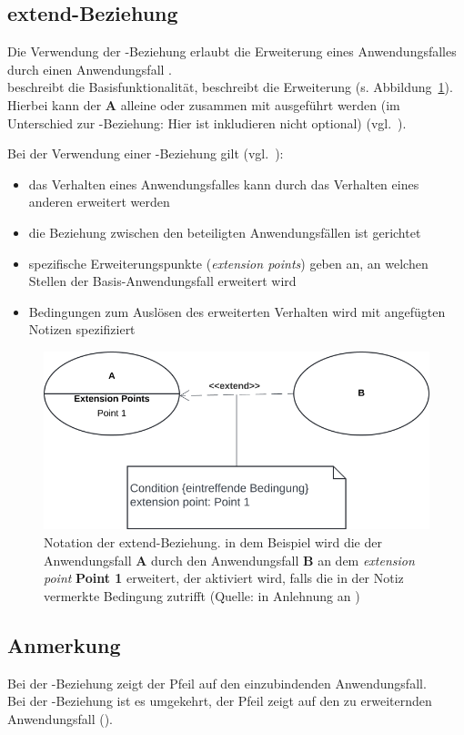 \subsection{extend-Beziehung}
Die Verwendung der -Beziehung erlaubt die Erweiterung eines Anwendungsfalles  durch einen Anwendungsfall .\\
 beschreibt die Basisfunktionalität,  beschreibt die Erweiterung (s. Abbildung~\ref{fig:usecase-extend}).
Hierbei kann der \textbf{A} alleine oder zusammen mit  ausgeführt werden (im Unterschied zur -Beziehung: Hier ist inkludieren nicht optional) (vgl.~\cite[54]{Bal05}).

\noindent
Bei der Verwendung einer -Beziehung gilt (vgl.~\cite[53]{Buh09}):

\begin{itemize}
    \item das Verhalten eines Anwendungsfalles kann durch das Verhalten eines anderen erweitert werden
    \item die Beziehung zwischen den beteiligten Anwendungsfällen ist gerichtet
    \item spezifische Erweiterungspunkte (\textit{extension points}) geben an, an welchen Stellen der Basis-Anwendungsfall erweitert wird
    \item Bedingungen zum Auslösen des erweiterten Verhalten wird mit angefügten Notizen spezifiziert
\end{itemize}

\begin{figure}
    \centering
    \includegraphics[scale=0.4]{part three/Anwendungsfalldiagramm/img/usecase-extend}
    \caption{Notation der extend-Beziehung. in dem Beispiel wird die der Anwendungsfall \textbf{A} durch den Anwendungsfall \textbf{B} an dem \textit{extension point} \textbf{Point 1} erweitert, der aktiviert wird, falls die in der Notiz vermerkte Bedingung zutrifft (Quelle: in Anlehnung an \cite[65, Abb. 2.8-4]{Bal05})}
    \label{fig:usecase-extend}
\end{figure}

\subsection*{Anmerkung}
Bei der -Beziehung zeigt der Pfeil auf den einzubindenden Anwendungsfall.\\
Bei der -Beziehung ist es umgekehrt, der Pfeil zeigt auf den zu erweiternden Anwendungsfall (\cite[218]{Oes05}).